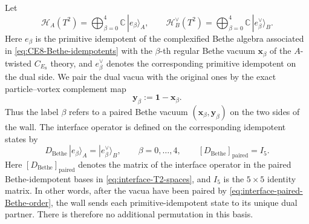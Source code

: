 \documentclass[11pt,a4paper]{article}
\numberwithin{equation}{section}
\begin{document}
Let
\begin{equation}
  \mathscr H_A(T^2)
  =\bigoplus_{\beta=0}^{4}\mathbb C\,|e_\beta\rangle_A,
  \qquad
  \mathscr H_B^{\vee}(T^2)
  =\bigoplus_{\beta=0}^{4}\mathbb C\,|e_\beta^\vee\rangle_{B}.
  \label{eq:interface-T2-spaces}
\end{equation}
Here $e_\beta$ is the primitive idempotent of the complexified Bethe algebra associated in \eqref{eq:CE8-Bethe-idempotents} with the $\beta$-th regular Bethe vacuum $\boldsymbol x_\beta$ of the $A$-twisted $C_{E_8}$ theory, and $e_\beta^\vee$ denotes the corresponding primitive idempotent on the dual side.  We pair the dual vacua with the original ones by the exact particle--vortex complement map
\begin{equation}
  \boldsymbol y_\beta
  :=\boldsymbol1-\boldsymbol x_\beta.
  \label{eq:interface-paired-Bethe-order}
\end{equation}
Thus the label $\beta$ refers to a paired Bethe vacuum $(\boldsymbol x_\beta,\boldsymbol y_\beta)$ on the two sides of the wall.  The interface operator is defined on the corresponding idempotent states by
\begin{equation}
  D_{\mathrm{Bethe}}\,|e_\beta\rangle_A
  =|e_\beta^\vee\rangle_{B},
  \qquad \beta=0,\ldots,4,
  \qquad
  [D_{\mathrm{Bethe}}]_{\mathrm{paired}}=I_5.
  \label{eq:interface-DBethe}
\end{equation}
Here $[D_{\mathrm{Bethe}}]_{\mathrm{paired}}$ denotes the matrix of the interface operator in the paired Bethe-idempotent bases in \eqref{eq:interface-T2-spaces}, and $I_5$ is the $5\times5$ identity matrix.  In other words, after the vacua have been paired by \eqref{eq:interface-paired-Bethe-order}, the wall sends each primitive-idempotent state to its unique dual partner.  There is therefore no additional permutation in this basis.
\end{document}
